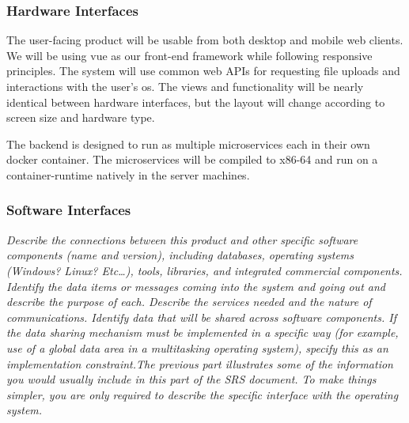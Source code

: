        \subsubsection{Hardware Interfaces}\label{sec:hardware-interfaces}
            The user-facing product will be usable from both desktop and mobile web clients. We will be using \gls{vue} as our front-end framework while following \gls{responsive} principles. The system will use common web APIs for requesting file uploads and interactions with the user's \gls{os}. The views and functionality will be nearly identical between hardware interfaces, but the layout will change according to screen size and hardware type.
        \par The backend is designed to run as multiple \glspl{microservice} each in their own \gls{docker} container. The \glspl{microservice} will be compiled to \gls{x86-64} and run on a \gls{container-runtime} natively in the server machines.
        \subsubsection{Software Interfaces}\label{sec:software-interfaces}
            \emph{Describe the connections between this product and other specific software components (name and version), including databases, operating systems (Windows? Linux? Etc\dots), tools, libraries, and integrated commercial components. Identify the data items or messages coming into the system and going out and describe the purpose of each. Describe the services needed and the nature of communications. Identify data that will be shared across software components. If the data sharing mechanism must be implemented in a specific way (for example, use of a global data area in a multitasking operating system), specify this as an implementation constraint.\gnl The previous part illustrates some of the information you would usually include in this part of the SRS document. To make things simpler, you are only required to describe the specific interface with the operating system.}
